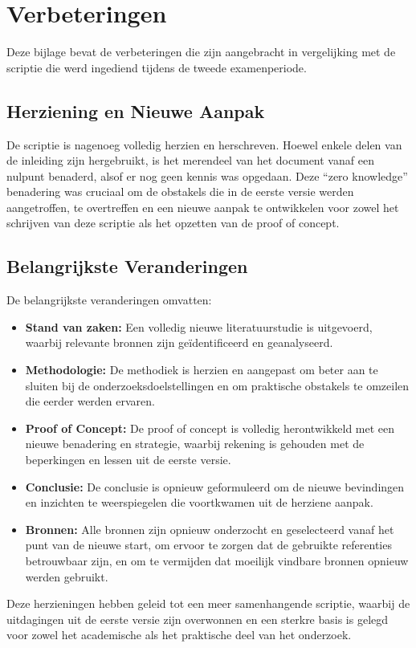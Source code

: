 
\chapter{Verbeteringen}%
\label{ch:verbeteringen}

Deze bijlage bevat de verbeteringen die zijn aangebracht in vergelijking met de scriptie die werd ingediend tijdens de tweede examenperiode.

\section{Herziening en Nieuwe Aanpak}

De scriptie is nagenoeg volledig herzien en herschreven. Hoewel enkele delen van de inleiding zijn hergebruikt, is het merendeel van het document vanaf een nulpunt benaderd, alsof er nog geen kennis was opgedaan. Deze ``zero knowledge'' benadering was cruciaal om de obstakels die in de eerste versie werden aangetroffen, te overtreffen en een nieuwe aanpak te ontwikkelen voor zowel het schrijven van deze scriptie als het opzetten van de proof of concept.

\section{Belangrijkste Veranderingen}

De belangrijkste veranderingen omvatten:
\begin{itemize}
    \item \textbf{Stand van zaken:} Een volledig nieuwe literatuurstudie is uitgevoerd, waarbij relevante bronnen zijn geïdentificeerd en geanalyseerd.
    \item \textbf{Methodologie:} De methodiek is herzien en aangepast om beter aan te sluiten bij de onderzoeksdoelstellingen en om praktische obstakels te omzeilen die eerder werden ervaren.
    \item \textbf{Proof of Concept:} De proof of concept is volledig herontwikkeld met een nieuwe benadering en strategie, waarbij rekening is gehouden met de beperkingen en lessen uit de eerste versie.
    \item \textbf{Conclusie:} De conclusie is opnieuw geformuleerd om de nieuwe bevindingen en inzichten te weerspiegelen die voortkwamen uit de herziene aanpak.
    \item \textbf{Bronnen:} Alle bronnen zijn opnieuw onderzocht en geselecteerd vanaf het punt van de nieuwe start, om ervoor te zorgen dat de gebruikte referenties betrouwbaar zijn, en om te vermijden dat moeilijk vindbare bronnen opnieuw werden gebruikt.
\end{itemize}

Deze herzieningen hebben geleid tot een meer samenhangende scriptie, waarbij de uitdagingen uit de eerste versie zijn overwonnen en een sterkre basis is gelegd voor zowel het academische als het praktische deel van het onderzoek.